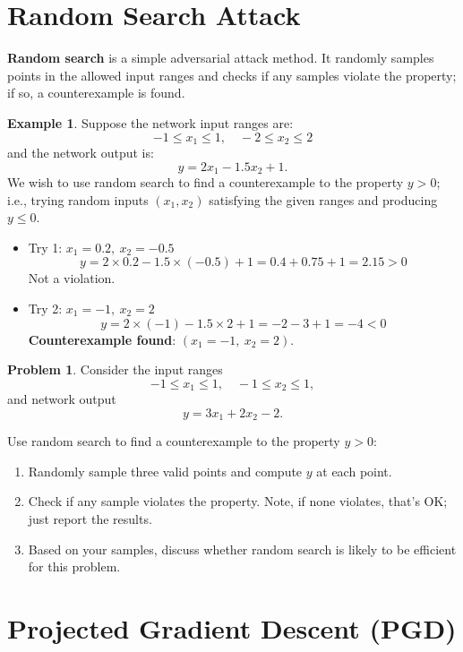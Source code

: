 \documentclass[oneside,11pt,dvipsnames]{book}
\numberwithin{equation}{section}
\theoremstyle{definition}
\newtheorem{example}{Example}[section]
\newtheorem{problem}{Problem}[section]
\theoremstyle{remark}
\begin{document}
\section{Random Search Attack}
\textbf{Random search} is a simple adversarial attack method.  It randomly samples points in the allowed input ranges and checks if any samples violate the property; if so, a counterexample is found.

\begin{example}\label{ex:random-search}
Suppose the network input ranges are:
\[
-1 \leq x_1 \leq 1,\quad -2 \leq x_2 \leq 2
\]
and the network output is:
\[
y = 2x_1 - 1.5x_2 + 1.
\]
We wish to use random search to find a counterexample to the property $y > 0$; i.e.,  trying random inputs $(x_1, x_2)$ satisfying the given ranges and producing $y \leq 0$.


\begin{itemize}
    \item Try 1: $x_1 = 0.2,\ x_2 = -0.5$
    \[
    y = 2 \times 0.2 - 1.5 \times (-0.5) + 1 = 0.4 + 0.75 + 1 = 2.15 > 0
    \]
    Not a violation.

    \item Try 2: $x_1 = -1,\ x_2 = 2$
    \[
    y = 2 \times (-1) - 1.5 \times 2 + 1 = -2 - 3 + 1 = -4 < 0
    \]
    \textbf{Counterexample found}: $(x_1 = -1,\ x_2 = 2)$.
\end{itemize}
\end{example}

\begin{problem}
Consider the input ranges
\[
-1 \le x_1 \le 1, \quad -1 \le x_2 \le 1,
\]
and network output
\[
y = 3x_1 + 2x_2 - 2.
\]

Use random search to find a counterexample to the property $y > 0$:
\begin{enumerate}
    \item Randomly sample three valid points and compute $y$ at each point.
    \item Check if any sample violates the property. Note, if none violates, that's OK; just report the results.
    \item Based on your samples, discuss whether random search is likely to be efficient for this problem.
\end{enumerate}
\end{problem}

\section{Projected Gradient Descent (PGD)}
\end{document}

